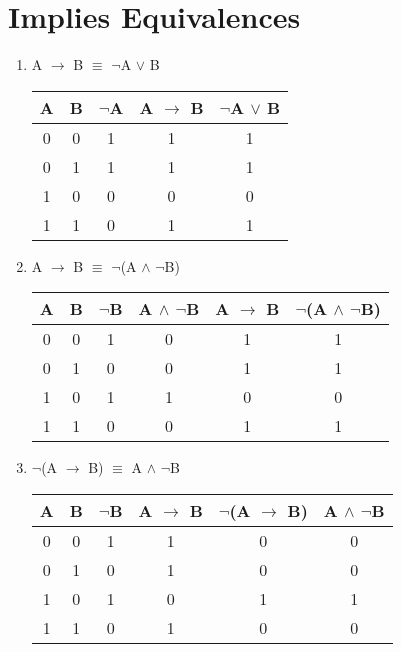 \documentclass{report}
\begin{document}
\section{Implies Equivalences}
\begin{enumerate}

  \item A $\to$ B $\equiv$ $\neg$A $\lor$ B

\begin{center}
  \begin{tabular}{| c | c | c | c | c |}
    \hline
    A & B & $\neg$A & A $\to$ B & $\neg$A $\lor$ B \\ \hline
    0 & 0 & 1 & 1 & 1 \\
    0 & 1 & 1 & 1 & 1 \\ 
    1 & 0 & 0 & 0 & 0 \\
    1 & 1 & 0 & 1 & 1 \\ \hline
  \end{tabular}
\end{center}

  \item A $\to$ B $\equiv$ $\neg$(A $\land$ $\neg$B)

\begin{center}
  \begin{tabular}{| c | c | c | c | c | c |}
    \hline
    A & B & $\neg$B & A $\land$ $\neg$B & A $\to$ B & $\neg$(A $\land$ $\neg$B) \\ \hline
    0 & 0 & 1 & 0 & 1 & 1 \\
    0 & 1 & 0 & 0 & 1 & 1 \\
    1 & 0 & 1 & 1 & 0 & 0 \\
    1 & 1 & 0 & 0 & 1 & 1 \\ \hline
  \end{tabular}
\end{center}

  \item $\neg$(A $\to$ B) $\equiv$ A $\land$ $\neg$B

\begin{center}
  \begin{tabular}{| c | c | c | c | c | c |}
    \hline
    A & B & $\neg$B & A $\to$ B & $\neg$(A $\to$ B) & A $\land$ $\neg$B \\ \hline
    0 & 0 & 1 & 1 & 0 & 0 \\
    0 & 1 & 0 & 1 & 0 & 0 \\
    1 & 0 & 1 & 0 & 1 & 1 \\
    1 & 1 & 0 & 1 & 0 & 0 \\ \hline
  \end{tabular}
\end{center}
\end{enumerate}
\end{document}
